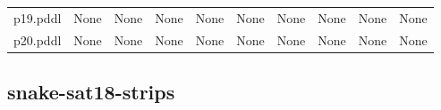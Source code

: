 \documentclass{article}
\begin{document}
\begin{tabular}{@{}lrrrrrrrrr@{}}
p19.pddl & \multicolumn{1}{|l|}{None} & \multicolumn{1}{|l|}{None} & \multicolumn{1}{|l|}{None} & \multicolumn{1}{|l|}{None} & \multicolumn{1}{|l|}{None} & \multicolumn{1}{|l|}{None} & \multicolumn{1}{|l|}{None} & \multicolumn{1}{|l|}{None} & \multicolumn{1}{|l|}{None} \\
p20.pddl & \multicolumn{1}{|l|}{None} & \multicolumn{1}{|l|}{None} & \multicolumn{1}{|l|}{None} & \multicolumn{1}{|l|}{None} & \multicolumn{1}{|l|}{None} & \multicolumn{1}{|l|}{None} & \multicolumn{1}{|l|}{None} & \multicolumn{1}{|l|}{None} & \multicolumn{1}{|l|}{None} \\
\end{tabular}

\hypertarget{cost-snake-sat18-strips}{}
\subsection*{snake-sat18-strips}
\end{document}
